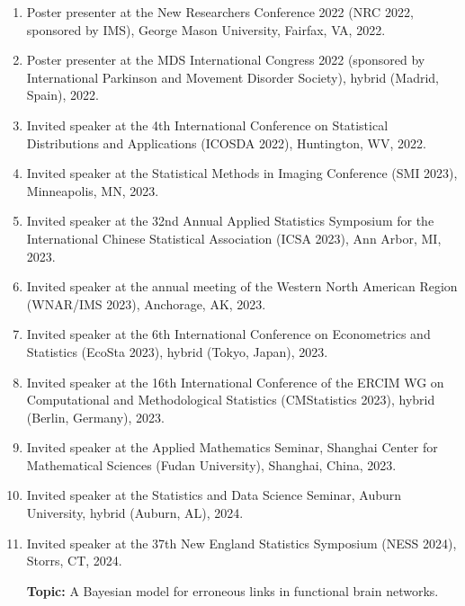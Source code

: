 \documentclass[12pt]{article}
\begin{document}
\begin{enumerate}
		\item Poster presenter at the New Researchers Conference 
		2022 (NRC 2022, sponsored by IMS), George Mason University, 
		Fairfax, VA, 2022.
	
		\item Poster presenter at the MDS International Congress 2022 (sponsored by International Parkinson and Movement Disorder Society), hybrid (Madrid, Spain), 2022.
		
		\item Invited speaker at the 4th International Conference on 
		Statistical Distributions and Applications (ICOSDA 2022), 
		Huntington, WV, 2022. 
		
		\item Invited speaker at the Statistical Methods in Imaging 
		Conference (SMI 2023), Minneapolis, MN, 2023.
		
		\item Invited speaker at the 32nd Annual Applied Statistics 
		Symposium for the International Chinese Statistical 
		Association (ICSA 2023), Ann Arbor, MI, 2023.
		
		\item Invited speaker at the annual meeting of the Western 
		North American Region (WNAR/IMS 2023), Anchorage, AK, 2023.
		
		\item Invited speaker at the 6th International Conference on 
		Econometrics and Statistics (EcoSta 2023), hybrid (Tokyo, 
		Japan), 2023.
		
		\item Invited speaker at the 16th International Conference 
		of the ERCIM WG on Computational and Methodological 
		Statistics (CMStatistics 2023), hybrid (Berlin, Germany), 
		2023.
		
		\item Invited speaker at the Applied Mathematics Seminar, 
		Shanghai Center for Mathematical Sciences (Fudan 
		University), Shanghai, China, 2023.	
		
		\item Invited speaker at the Statistics and Data Science 
		Seminar, Auburn University, hybrid (Auburn, AL), 2024.	
		
		\item Invited speaker at the 37th New England Statistics 
		Symposium (NESS 2024), Storrs, CT, 2024. 
		
		\textbf{Topic:} A Bayesian model for erroneous links in 
		functional brain networks.
		

\end{enumerate}
\end{document}
